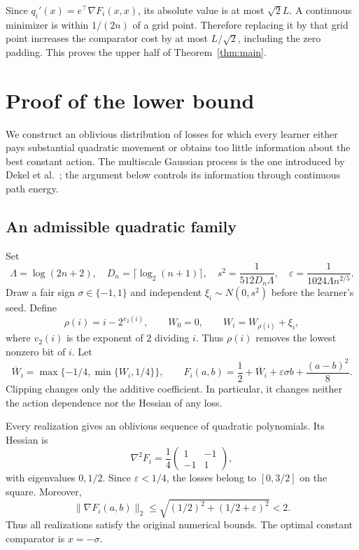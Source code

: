 \documentclass[11pt]{article}
\theoremstyle{definition}
\begin{document}
Since $q_i'(x)=e^\top\nabla F_i(x,x)$, its absolute value is at most $\sqrt2L$. A continuous minimizer is within $1/(2n)$ of a grid point. Therefore replacing it by that grid point increases the comparator cost by at most $L/\sqrt2$, including the zero padding. This proves the upper half of Theorem~\ref{thm:main}.

\section{Proof of the lower bound}\label{sec:lower}

We construct an oblivious distribution of losses for which every learner either pays substantial quadratic movement or obtains too little information about the best constant action. The multiscale Gaussian process is the one introduced by Dekel et al.~\cite{dekel}; the argument below controls its information through continuous path energy.

\subsection{An admissible quadratic family}

Set
\begin{equation}\label{eq:lower-parameters}
 \Lambda=\log(2n+2),\quad
 D_n=\lceil\log_2(n+1)\rceil,\quad
 s^2=\frac1{512D_n\Lambda},\quad
 \varepsilon=\frac1{1024\Lambda n^{2/5}}.
\end{equation}
Draw a fair sign $\sigma\in\{-1,1\}$ and independent $\xi_i\sim N(0,s^2)$ before the learner's seed. Define
\[
 \rho(i)=i-2^{v_2(i)},\qquad W_0=0,\qquad W_i=W_{\rho(i)}+\xi_i,
\]
where $v_2(i)$ is the exponent of $2$ dividing $i$. Thus $\rho(i)$ removes the lowest nonzero bit of $i$. Let
\[
 \overline W_i=\max\{-1/4,\min\{W_i,1/4\}\},
 \qquad
 F_i(a,b)=\frac12+\overline W_i+\varepsilon\sigma b+\frac{(a-b)^2}{8}.
\]
Clipping changes only the additive coefficient. In particular, it changes neither the action dependence nor the Hessian of any loss.

Every realization gives an oblivious sequence of quadratic polynomials. Its Hessian is
\[
 \nabla^2F_i=\frac14\begin{pmatrix}1&-1\\-1&1\end{pmatrix},
\]
with eigenvalues $0,1/2$. Since $\varepsilon<1/4$, the losses belong to $[0,3/2]$ on the square. Moreover,
\[
 \|\nabla F_i(a,b)\|_2
 \leq\sqrt{(1/2)^2+(1/2+\varepsilon)^2}<2.
\]
Thus all realizations satisfy the original numerical bounds. The optimal constant comparator is $x=-\sigma$.
\end{document}
